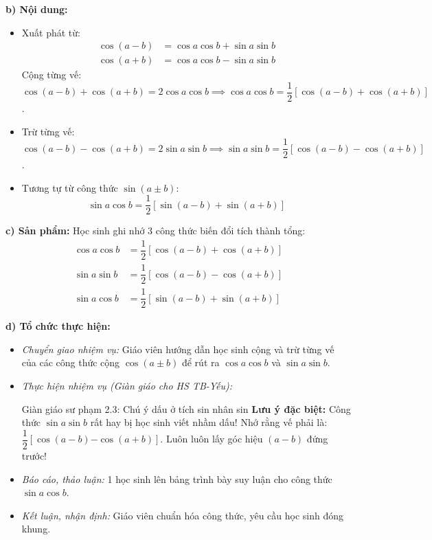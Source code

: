\documentclass[12pt, a4paper]{article}
\begin{document}
\textbf{b) Nội dung:}
\begin{itemize}[leftmargin=0.6cm]
    \item Xuất phát từ:
    \begin{align*}
        \cos(a - b) &= \cos a \cos b + \sin a \sin b \\
        \cos(a + b) &= \cos a \cos b - \sin a \sin b
    \end{align*}
    Cộng từng vế: $\cos(a - b) + \cos(a + b) = 2\cos a \cos b \implies \cos a \cos b = \dfrac{1}{2}[\cos(a - b) + \cos(a + b)]$.
    \item Trừ từng vế: $\cos(a - b) - \cos(a + b) = 2\sin a \sin b \implies \sin a \sin b = \dfrac{1}{2}[\cos(a - b) - \cos(a + b)]$.
    \item Tương tự từ công thức $\sin(a \pm b)$:
    $$\sin a \cos b = \dfrac{1}{2}[\sin(a - b) + \sin(a + b)]$$
\end{itemize}

\textbf{c) Sản phẩm:} Học sinh ghi nhớ 3 công thức biến đổi tích thành tổng:
\begin{align*}
    \cos a \cos b &= \dfrac{1}{2}[\cos(a - b) + \cos(a + b)] \\
    \sin a \sin b &= \dfrac{1}{2}[\cos(a - b) - \cos(a + b)] \\
    \sin a \cos b &= \dfrac{1}{2}[\sin(a - b) + \sin(a + b)]
\end{align*}

\textbf{d) Tổ chức thực hiện:}
\begin{itemize}[leftmargin=0.6cm]
    \item \textit{Chuyển giao nhiệm vụ:} Giáo viên hướng dẫn học sinh cộng và trừ từng vế của các công thức cộng $\cos(a \pm b)$ để rút ra $\cos a \cos b$ và $\sin a \sin b$.
    \item \textit{Thực hiện nhiệm vụ (Giàn giáo cho HS TB-Yếu):}
    \begin{scaffoldbox}{Giàn giáo sư phạm 2.3: Chú ý dấu ở tích sin nhân sin}
        \textbf{Lưu ý đặc biệt:} Công thức $\sin a \sin b$ rất hay bị học sinh viết nhầm dấu!
        Nhớ rằng vế phải là: $\dfrac{1}{2}[\cos(a - b) \mathbf{-} \cos(a + b)]$. Luôn luôn lấy góc hiệu $(a - b)$ đứng trước!
    \end{scaffoldbox}
    \item \textit{Báo cáo, thảo luận:} 1 học sinh lên bảng trình bày suy luận cho công thức $\sin a \cos b$.
    \item \textit{Kết luận, nhận định:} Giáo viên chuẩn hóa công thức, yêu cầu học sinh đóng khung.
\end{itemize}
\end{document}
